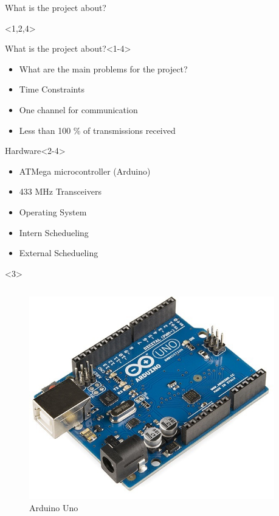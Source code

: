 \begin{frame}{What is the project about?}
\begin{onlyenv}<1,2,4>
	\begin{block}{What is the project about?}<1-4>
	 	\begin{itemize}
			\item What are the main problems for the project?
			\item Time Constraints
			\item \textcolor{ReneOrange}{One channel} for communication
			\item Less than 100 \% of transmissions received
		\end{itemize}
	\end{block}

	\begin{block}{Hardware}<2-4>
		\begin{itemize}
			\item ATMega microcontroller (\textcolor{ReneOrange}{Arduino})
			\item 433 MHz Transceivers
			\item Operating System
			\item Intern \textcolor{ReneOrange}{Schedueling}
			\item External \textcolor{ReneOrange}{Schedueling}
		\end{itemize}
	\end{block}
\end{onlyenv}

\begin{onlyenv}<3>
	\begin{minipage}[0.3\textheight]{\textwidth}
	\begin{columns}[T]
	\begin{column}{0.5\textwidth}
		\begin{figure}
	 	 \includegraphics[width=1\textwidth,height=1\textheight,keepaspectratio]{figures/Arduino_Uno.jpg}
	 	 \caption{Arduino Uno}
	 	 \end{figure}
	\end{column}
	\begin{column}{0.5\textwidth}


\end{column}
\end{columns}
\end{minipage}
\end{onlyenv}
\end{frame}
